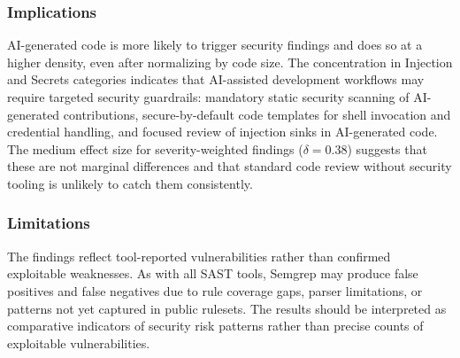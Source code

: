 \begin{table}[H]
\centering
\caption{Five most frequent CWE types in AI-generated and human-written code.}
\label{tab:rq3_top5_cwe}
\small
{}
\end{table}

\subsubsection{Implications}

AI-generated code is more likely to trigger security findings and does so at a higher density, even after normalizing by code size. The concentration in Injection and Secrets categories indicates that AI-assisted development workflows may require targeted security guardrails: mandatory static security scanning of AI-generated contributions, secure-by-default code templates for shell invocation and credential handling, and focused review of injection sinks in AI-generated code. The medium effect size for severity-weighted findings ($\delta = 0.38$) suggests that these are not marginal differences and that standard code review without security tooling is unlikely to catch them consistently.

\subsubsection{Limitations}

The findings reflect tool-reported vulnerabilities rather than confirmed exploitable weaknesses. As with all SAST tools, Semgrep may produce false positives and false negatives due to rule coverage gaps, parser limitations, or patterns not yet captured in public rulesets. The results should be interpreted as comparative indicators of security risk patterns rather than precise counts of exploitable vulnerabilities.
